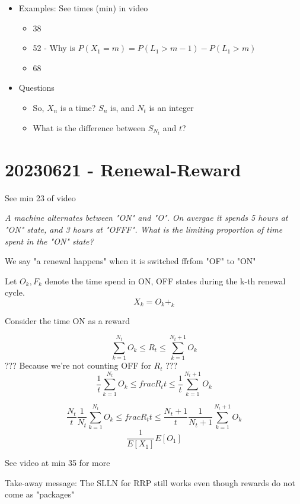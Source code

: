 \documentclass{report}
\begin{document}
\begin{itemize}
      \item Examples: See times (min) in video
        \begin{itemize}
          \item 38
          \item 52 - Why is $P(X_1=m) = P(L_1 > m-1) - P(L_1 >m)$
          \item 68
        \end{itemize}
      \item Questions
        \begin{itemize}
          \item So, $X_n$ is a time?  $S_n$ is, and $N_t$ is an integer
          \item What is the difference between $S_{N_t}$ and $t$?
        \end{itemize}
      

  \end{itemize}

\chapter*{20230621 - Renewal-Reward}
   {
    See min 23 of video

    \textit{A machine alternates between "ON" and "O".  On avergae it spends 5 hours at "ON" state, and 3 hours at "OFFF".  What is the limiting proportion of time spent in the "ON" state?}

    We say "a renewal happens" when it is switched ffrfom "OF" to "ON"

    Let $O_k, F_k$ denote the time spend in ON, OFF states during the k-th
    renewal cycle.
    \[ X_k = O_k + _k \]

    Consider the time ON as a reward

    \[ \sum^{N_t}_{k=1} O_k \leq R_t \leq \sum^{N_t+1}_{k=1} O_k \]
    ??? Because we're not counting OFF for $R_t$ ???
    \[ \frac{1}{t} \sum^{N_t}_{k=1} O_k \leq frac{R_t}{t} \leq \frac{1}{t} \sum^{N_t+1}_{k=1} O_k \]

   \[ \frac{N_t}{t} \frac{1}{N_t} \sum^{N_t}_{k=1} O_k \leq frac{R_t}{t} \leq \frac{N_t+1}{t} \frac{1}{N_t+1} \sum^{N_t+1}_{k=1} O_k \]
    \[ \frac{1}{E[X_1]} E[O_1]  \]

    See video at min 35 for more

  }

  Take-away message:  The SLLN  for RRP still works even though rewards
  do not come as "packages"
\end{document}
